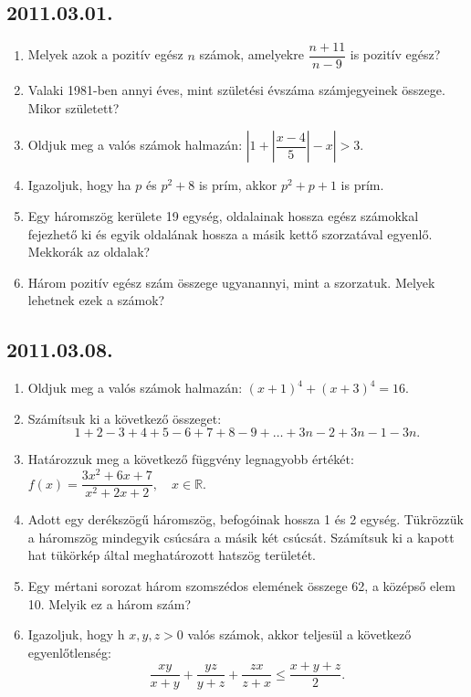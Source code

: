 \subsection*{2011.03.01.}
\begin{enumerate}
\item Melyek azok a pozitív egész $n$ számok, amelyekre $\dfrac{n+11}{n-9}$ is pozitív egész?
\item Valaki 1981-ben annyi éves, mint születési évszáma számjegyeinek összege. Mikor született?
\item Oldjuk meg a valós számok halmazán: 
$\left| 1+\left|\dfrac{x-4}{5}\right|-x\right|>3$.
\item Igazoljuk, hogy ha $p$ és $p^2+8$ is prím, akkor $p^2+p+1$ is prím.
\item Egy háromszög kerülete 19 egység, oldalainak hossza egész számokkal fejezhető ki és egyik oldalának hossza a másik kettő szorzatával egyenlő. Mekkorák az oldalak?
\item Három pozitív egész szám összege ugyanannyi, mint a szorzatuk. Melyek lehetnek ezek a számok?
\end{enumerate}

\subsection*{2011.03.08.}
\begin{enumerate}
\item Oldjuk meg a valós számok halmazán: $(x+1)^4+(x+3)^4=16$.
\item Számítsuk ki a következő összeget:
$$1+2-3+4+5-6+7+8-9+\ldots+3n-2+3n-1-3n.$$
\item Határozzuk meg a következő függvény legnagyobb értékét:$f(x)=\dfrac{3x^2+6x+7}{x^2+2x+2},\quad x\in\mathbb{R}$.
\item Adott egy derékszögű háromszög, befogóinak hossza 1 és 2 egység. Tükrözzük a háromszög mindegyik csúcsára a másik két csúcsát. Számítsuk ki a kapott hat tükörkép által meghatározott hatszög területét.
\item Egy mértani sorozat három szomszédos elemének összege 62, a középső elem 10. 
Melyik ez a három szám?
\item Igazoljuk, hogy h $x,y,z>0$ valós számok, akkor teljesül a következő egyenlőtlenség:
$$\dfrac{xy}{x+y}+\dfrac{yz}{y+z}+\dfrac{zx}{z+x}\le\dfrac{x+y+z}{2}.$$
\end{enumerate}

